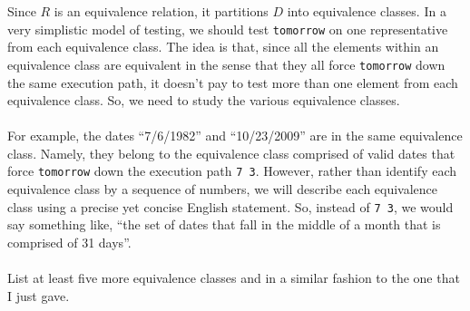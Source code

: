 \documentclass[12pt]{exam}
\begin{document}
\begin{questions}
\clearpage

	\question[5] Since $R$ is an equivalence relation, it partitions $D$ into equivalence classes. In a very simplistic model of testing, we should test {\tt tomorrow} on one representative from each equivalence class. The idea is that, since all the elements within an equivalence class are equivalent in the sense that they all force {\tt tomorrow} down the same execution path, it doesn't pay to test more than one element from each equivalence class. So, we need to study the various equivalence classes. \\\
	\\
	For example, the dates ``7/6/1982'' and ``10/23/2009'' are in the same equivalence class. Namely, they belong to the equivalence class comprised of valid dates that force {\tt tomorrow} down the execution path {\tt 7 3}. However, rather than identify each equivalence class by a sequence of numbers, we will describe each equivalence class using a precise yet concise English statement. So, instead of {\tt 7 3}, we would say something like, ``the set of dates that fall in the middle of a month that is comprised of 31 days''. \\
	\\
	List at least five more equivalence classes and in a similar fashion to the one that I just gave.
	
		

	
		
	
\end{questions}
		
\end{document}

